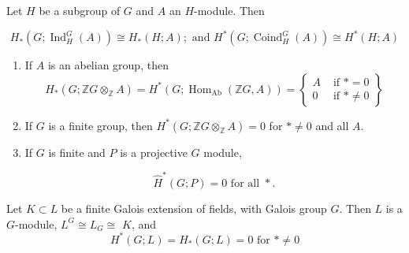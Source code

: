 \begin{theo} Let $H$ be a subgroup of $G$ and $A$ an $H$-module. Then

    $$
    H_*\left(G ; \operatorname{Ind}_H^G(A)\right) \cong H_*(H ; A) ; \text { and } H^*\left(G ; \operatorname{Coind}_H^G(A)\right) \cong H^*(H ; A)
    $$       
\end{theo}

\begin{coro}
    \begin{enumerate}
        \item If $A$ is an abelian group, then
        $$
        H_*\left(G ; \mathbb{Z} G \otimes_{\mathbb{Z}} A\right)=H^*\left(G ; \operatorname{Hom}_{\mathrm{Ab}}(\mathbb{Z} G, A)\right)=\left\{\begin{array}{ll}
        A & \text { if } *=0 \\
        0 & \text { if } * \neq 0
        \end{array}\right\}
        $$
    \item If $G$ is a finite group, then $H^*\left(G ; \mathbb{Z} G \otimes_{\mathbb{Z}} A\right)=0$ for $* \neq 0$ and all $A$. 
    \item If $G$ is finite and $P$ is a projective $G$ module,

    $$
    \widehat{H}^*(G ; P)=0 \text { for all } * .
    $$
    
    \end{enumerate}
\end{coro}

\begin{theo}
Let $K \subset L$ be a finite Galois extension of fields, with Galois group $G$. Then $L$ is a $G$-module, $L^G \cong L_G \cong$ $K$, and
    $$
    H^*(G ; L)=H_*(G ; L)=0 \text { for } * \neq 0
    $$ %
\end{theo}

